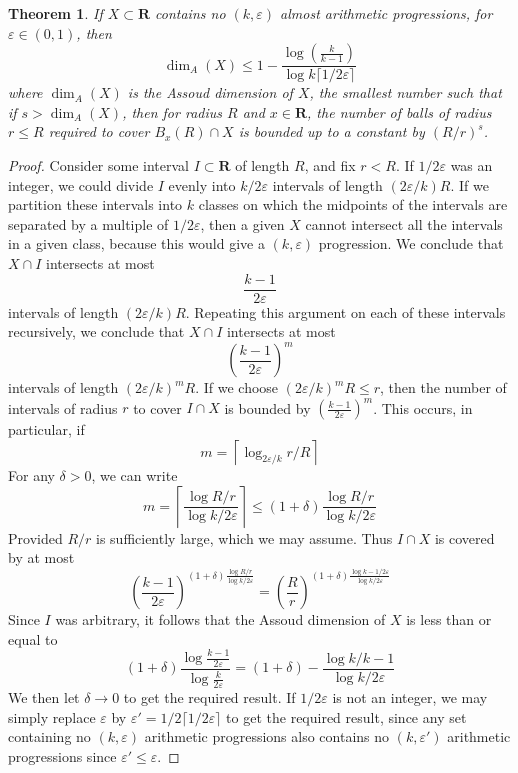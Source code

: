 \documentclass{article}
\theoremstyle{plain}
\theoremstyle{plain}
\newtheorem{theorem}{Theorem}
\begin{document}
\begin{theorem}
    If $X \subset \mathbf{R}$ contains no $(k,\varepsilon)$ almost arithmetic progressions, for $\varepsilon \in (0,1)$, then
    \[ \dim_A(X) \leq 1 - \frac{\log(\frac{k}{k-1})}{\log k \lceil 1/2\varepsilon \rceil} \]
    where $\dim_A(X)$ is the {\it Assoud dimension} of $X$, the smallest number such that if $s > \dim_A(X)$, then for radius $R$ and $x \in \mathbf{R}$, the number of balls of radius $r \leq R$ required to cover $B_x(R) \cap X$ is bounded up to a constant by $(R/r)^s$.
\end{theorem}
\begin{proof}
    Consider some interval $I \subset \mathbf{R}$ of length $R$, and fix $r < R$. If $1/2\varepsilon$ was an integer, we could divide $I$ evenly into $k/2\varepsilon$ intervals of length $(2\varepsilon/k) R$. If we partition these intervals into $k$ classes on which the midpoints of the intervals are separated by a multiple of $1/2\varepsilon$, then a given $X$ cannot intersect all the intervals in a given class, because this would give a $(k,\varepsilon)$ progression. We conclude that $X \cap I$ intersects at most
    \[ \frac{k-1}{2 \varepsilon} \]
    intervals of length $(2 \varepsilon/k) R$. Repeating this argument on each of these intervals recursively, we conclude that $X \cap I$ intersects at most
    \[ \left( \frac{k-1}{2 \varepsilon} \right)^m \]
    intervals of length $(2 \varepsilon/k)^m R$. If we choose $(2 \varepsilon/k)^m R \leq r$, then the number of intervals of radius $r$ to cover $I \cap X$ is bounded by $\left( \frac{k-1}{2 \varepsilon} \right)^m$. This occurs, in particular, if
    \[ m = \left\lceil \log_{2\varepsilon/k} r/R \right\rceil \]
    For any $\delta > 0$, we can write
    \[ m = \left\lceil \frac{\log R/r}{\log k/2\varepsilon} \right\rceil \leq (1 + \delta) \frac{\log R/r}{\log k/2\varepsilon} \]
    Provided $R/r$ is sufficiently large, which we may assume. Thus $I \cap X$ is covered by at most
    \[ \left( \frac{k-1}{2 \varepsilon} \right)^{(1 + \delta) \frac{\log R/r}{\log k/2\varepsilon}} = \left(\frac{R}{r}\right)^{(1 + \delta) \frac{\log k-1/2\varepsilon}{\log k/2\varepsilon}} \]
    Since $I$ was arbitrary, it follows that the Assoud dimension of $X$ is less than or equal to
    \[ (1 + \delta) \frac{\log \frac{k-1}{2\varepsilon}}{\log \frac{k}{2\varepsilon}} = (1 + \delta) - \frac{\log k/k-1}{\log k/2\varepsilon} \]
    We then let $\delta \to 0$ to get the required result. If $1/2\varepsilon$ is not an integer, we may simply replace $\varepsilon$ by $\varepsilon' = 1/2\lceil 1/2\varepsilon \rceil$ to get the required result, since any set containing no $(k,\varepsilon)$ arithmetic progressions also contains no $(k,\varepsilon')$ arithmetic progressions since $\varepsilon' \leq \varepsilon$.
\end{proof}
\end{document}
